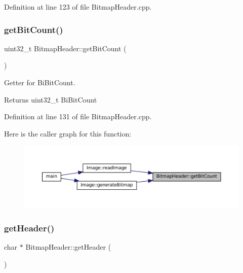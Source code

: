 Definition at line 123 of file Bitmap\+Header.\+cpp.

\mbox{\label{classBitmapHeader_a2660782990f1d9547e0aef501f666969}} 
\subsubsection{\texorpdfstring{getBitCount()}{getBitCount()}}
{\footnotesize\ttfamily uint32\+\_\+t Bitmap\+Header\+::get\+Bit\+Count (\begin{DoxyParamCaption}{ }\end{DoxyParamCaption})}



Getter for Bi\+Bit\+Count. 

\begin{DoxyReturn}{Returns}
uint32\+\_\+t Bi\+Bit\+Count 
\end{DoxyReturn}


Definition at line 131 of file Bitmap\+Header.\+cpp.

Here is the caller graph for this function\+:
\nopagebreak
\begin{figure}[H]
\begin{center}
\leavevmode
\includegraphics[width=350pt]{classBitmapHeader_a2660782990f1d9547e0aef501f666969_icgraph}
\end{center}
\end{figure}
\mbox{\label{classBitmapHeader_aa29e1acc8a7a588867039d7c0bdcde04}} 
\subsubsection{\texorpdfstring{getHeader()}{getHeader()}}
{\footnotesize\ttfamily char $\ast$ Bitmap\+Header\+::get\+Header (\begin{DoxyParamCaption}{ }\end{DoxyParamCaption})}



